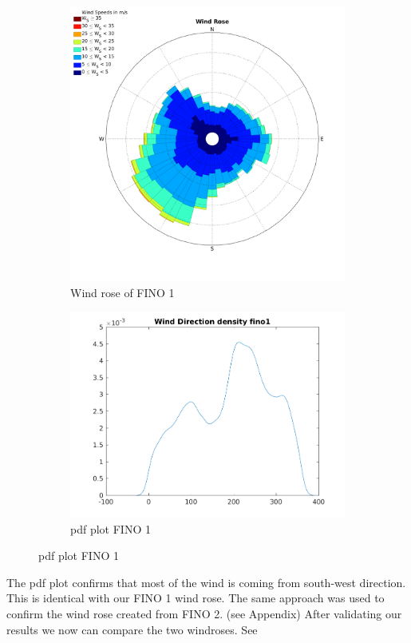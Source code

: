 \documentclass[10pt]{article}
\begin{document}
\begin{figure}[htb!]
\label{fig:WindRose1_valdidation}
\begin{subfigure}{0.5\textwidth}
  \centering
  \includegraphics[width=1\linewidth]{../figures/WindRose_Fino1.png}
  \caption{Wind rose of FINO 1}
  \label{fig:Windrose_Fino1}
\end{subfigure}
\begin{subfigure}{0.5\textwidth}
  \centering
  \includegraphics[width=1\linewidth]{../figures/Validation_WindRose_Fino1.png}
  \caption{pdf plot FINO 1}
    \label{fig:Windrose_Fino2}
\end{subfigure}
\end{figure}
\newpage
The pdf plot confirms that most of the wind is coming from south-west direction. This is identical with our FINO 1 wind rose. The same approach was used to confirm the wind rose created from FINO 2. (see Appendix)
After validating our results we now can compare the two windroses. See 
\end{document}
